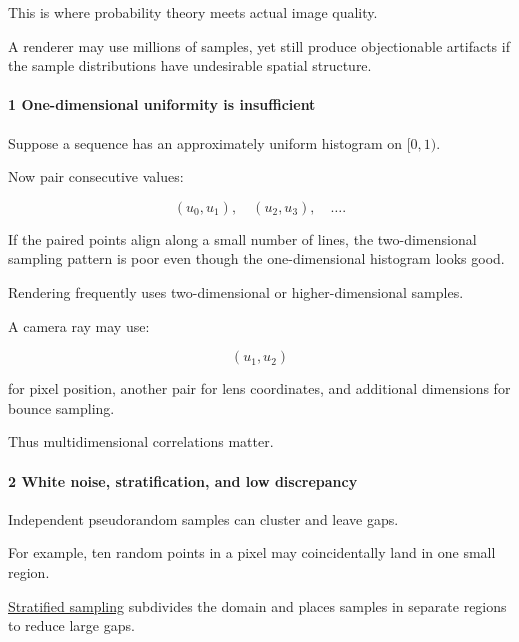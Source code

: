 \hypertarget{02-foundations-ii-ch029-random-number-quality-for-rendering}{}

This is where probability theory meets actual image quality.

A renderer may use millions of samples, yet still produce objectionable artifacts if the sample distributions have undesirable spatial structure.

\paragraph{1 One-dimensional uniformity is insufficient}\label{02-foundations-ii-ch029-one-dimensional-uniformity-is-insufficient}

\hypertarget{02-foundations-ii-ch029-one-dimensional-uniformity-is-insufficient}{}

Suppose a sequence has an approximately uniform histogram on \([0,1)\).

Now pair consecutive values:

\[
 (u_0,u_1),\quad(u_2,u_3),\quad\ldots.
\]

If the paired points align along a small number of lines, the two-dimensional sampling pattern is poor even though the one-dimensional histogram looks good.

Rendering frequently uses two-dimensional or higher-dimensional samples.

A camera ray may use:

\[
 (u_1,u_2)
\]

for pixel position, another pair for lens coordinates, and additional dimensions for bounce sampling.

Thus multidimensional correlations matter.

\paragraph{2 White noise, stratification, and low discrepancy}\label{02-foundations-ii-ch029-white-noise-stratification-and-low-discrepancy}

\hypertarget{02-foundations-ii-ch029-white-noise-stratification-and-low-discrepancy}{}

Independent pseudorandom samples can cluster and leave gaps.

For example, ten random points in a pixel may coincidentally land in one small region.

\hyperref[02-foundations-ii-ch029-a-computer-produces-deterministic-pseudorandom-sequences]{Stratified sampling} subdivides the domain and places samples in separate regions to reduce large gaps.

